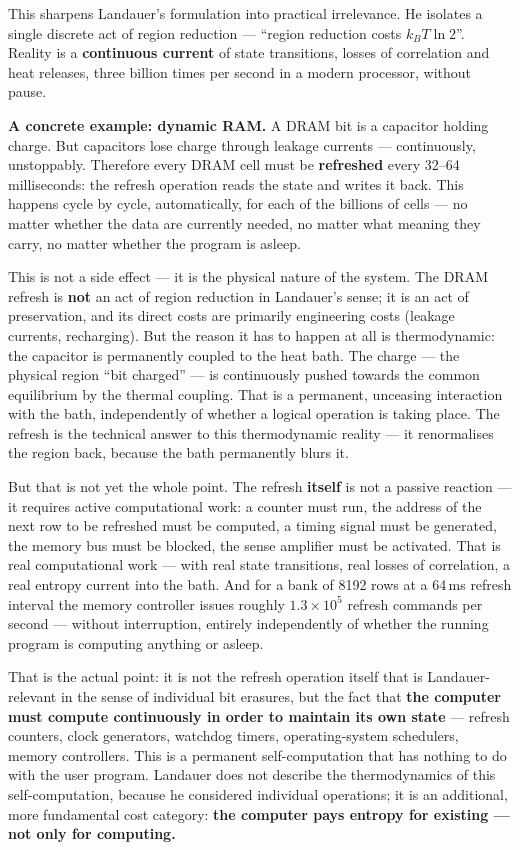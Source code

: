 This sharpens Landauer's formulation into practical irrelevance. He isolates a
single discrete act of region reduction --- “region reduction costs
$k_B T \ln 2$”. Reality is a \textbf{continuous current} of state transitions,
losses of correlation and heat releases, three billion times per second in a
modern processor, without pause.

\textbf{A concrete example: dynamic RAM.} A DRAM bit is a capacitor holding
charge. But capacitors lose charge through leakage currents --- continuously,
unstoppably. Therefore every DRAM cell must be \textbf{refreshed} every
32--64 milliseconds: the refresh operation reads the state and writes it back.
This happens cycle by cycle, automatically, for each of the billions of cells ---
no matter whether the data are currently needed, no matter what meaning they
carry, no matter whether the program is asleep.

This is not a side effect --- it is the physical nature of the system. The DRAM
refresh is \textbf{not} an act of region reduction in Landauer's sense; it is an
act of preservation, and its direct costs are primarily engineering costs (leakage
currents, recharging). But the reason it has to happen at all is thermodynamic:
the capacitor is permanently coupled to the heat bath. The charge --- the physical
region “bit charged” --- is continuously pushed towards the common equilibrium by
the thermal coupling. That is a permanent, unceasing interaction with the bath,
independently of whether a logical operation is taking place. The refresh is the
technical answer to this thermodynamic reality --- it renormalises the region
back, because the bath permanently blurs it.

But that is not yet the whole point. The refresh \textbf{itself} is not a passive
reaction --- it requires active computational work: a counter must run, the
address of the next row to be refreshed must be computed, a timing signal must be
generated, the memory bus must be blocked, the sense amplifier must be activated.
That is real computational work --- with real state transitions, real losses of
correlation, a real entropy current into the bath. And for a bank of 8192 rows at
a 64\,ms refresh interval the memory controller issues roughly
$1.3\times10^{5}$ refresh commands per second --- without interruption, entirely
independently of whether the running program is computing anything or asleep.

That is the actual point: it is not the refresh operation itself that is
Landauer-relevant in the sense of individual bit erasures, but the fact that
\textbf{the computer must compute continuously in order to maintain its own
state} --- refresh counters, clock generators, watchdog timers, operating-system
schedulers, memory controllers. This is a permanent self-computation that has
nothing to do with the user program. Landauer does not describe the
thermodynamics of this self-computation, because he considered individual
operations; it is an additional, more fundamental cost category:
\textbf{the computer pays entropy for existing --- not only for computing.}

